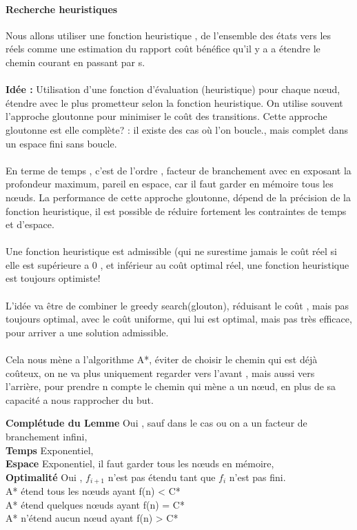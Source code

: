 \documentclass{article}
\begin{document}
\paragraph{Recherche heuristiques} 
Nous allons utiliser une fonction heuristique , de l'ensemble des états vers les réels comme une estimation du rapport coût bénéfice qu'il y a a étendre le chemin courant en passant par s.\\\\\textbf{Idée : }Utilisation d'une fonction d'évaluation (heuristique) pour chaque nœud, étendre avec le plus prometteur selon la fonction heuristique. On utilise souvent l'approche gloutonne pour minimiser le coût des transitions. Cette approche gloutonne est elle complète? : il existe des cas où l'on boucle., mais complet dans un espace fini sans boucle.\\\\En terme de temps , c'est de l'ordre , facteur de branchement avec en exposant la profondeur maximum, pareil en espace, car il faut garder en mémoire tous les nœuds. La performance de cette approche gloutonne, dépend de la précision de la fonction heuristique, il est possible de réduire fortement les contraintes de temps et d'espace.\\\\Une fonction heuristique est admissible (qui ne surestime jamais le coût réel si elle est supérieure a 0 , et inférieur au coût optimal réel, une fonction heuristique est toujours optimiste!\\\\L'idée va être de combiner le greedy search(glouton), réduisant le coût , mais pas toujours optimal, avec le coût uniforme, qui lui est optimal, mais pas très efficace, pour arriver a une solution admissible.\\\\Cela nous mène a l'algorithme A*, éviter de choisir le chemin qui est déjà coûteux, on ne va plus uniquement regarder vers l'avant , mais aussi vers l'arrière, pour prendre n compte le chemin qui mène a un nœud, en plus de sa capacité a nous rapprocher du but.
\newpage

\textbf{Complétude du Lemme} Oui , sauf dans le cas ou on a un facteur de branchement infini, \\\textbf{Temps} Exponentiel,\\\textbf{Espace} Exponentiel, il faut garder tous les nœuds en mémoire,\\\textbf{Optimalité} Oui , $f_{i+1}$ n’est pas étendu tant que $f_{i}$ n'est pas fini.\\A* étend tous les nœuds ayant f(n) < C*\\A* étend quelques nœuds ayant f(n) = C*\\A* n'étend aucun nœud ayant f(n) > C*
\end{document}
